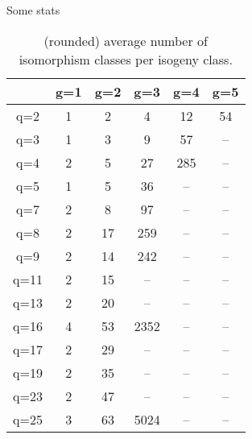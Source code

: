 \documentclass[usenames,dvipsnames,handout]{beamer}
\begin{document}
\begin{frame}{ Some stats }
    \begin{table}[h!]
        \small
        \begin{tabular}{|c|c|c|c|c|c|}\hline
            & g=1 & g=2 & g=3 & g=4 & g=5 \\\hline
            q=2 & 1 & 2 & 4 & 12 & 54 \\\hline
            q=3 & 1 & 3 & 9 & 57 &-- \\\hline
            q=4 & 2 & 5 & 27 & 285 &-- \\\hline
            q=5 & 1 & 5 & 36 &-- &-- \\\hline
            q=7 & 2 & 8 & 97 &-- &-- \\\hline
            q=8 & 2 & 17 & 259 &-- &-- \\\hline
            q=9 & 2 & 14 & 242 &-- &-- \\\hline
            q=11 & 2 & 15 &-- &-- &-- \\\hline
            q=13 & 2 & 20 &-- &-- &-- \\\hline
            q=16 & 4 & 53 & 2352 &-- &-- \\\hline
            q=17 & 2 & 29 &-- &-- &-- \\\hline
            q=19 & 2 & 35 &-- &-- &-- \\\hline
            q=23 & 2 & 47 &-- &-- &-- \\\hline
            q=25 & 3 & 63 & 5024 &-- &-- \\\hline
        \end{tabular}
    \caption{(rounded) average number of isomorphism classes per isogeny class.}
    \end{table}
\end{frame}
\end{document}
